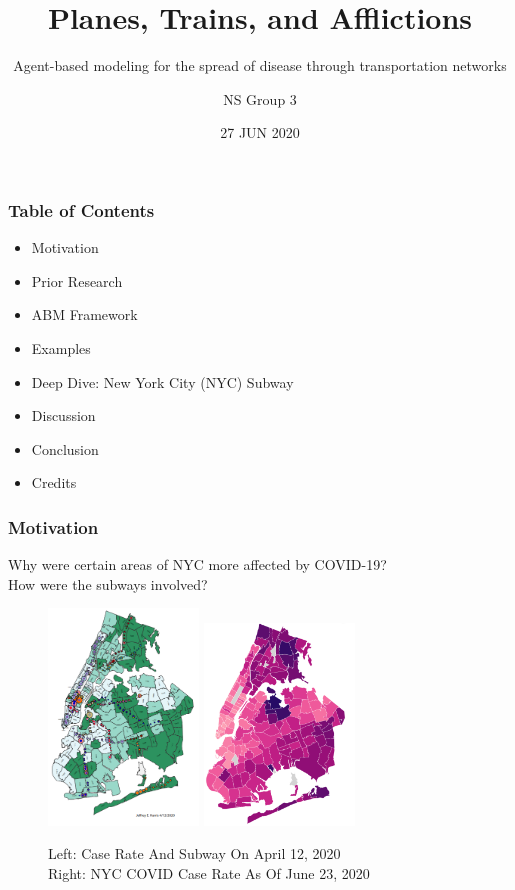 \documentclass{beamer}
\begin{document}
\title{Planes, Trains, and Afflictions}
\subtitle{Agent-based modeling for the spread of disease through transportation networks}
\author{NS Group 3}
\date{27 JUN 2020}
\begin{frame}
\titlepage
\end{frame}
\begin{frame}
\frametitle{Table of Contents}
\begin{itemize}
    \item Motivation
    \item Prior Research
    \item ABM Framework
    \item Examples
    \item Deep Dive: New York City (NYC) Subway
    \item Discussion
    \item Conclusion
    \item Credits
\end{itemize}
\end{frame}
\begin{frame}
\frametitle{Motivation}
Why were certain areas of NYC more affected by COVID-19?\\
How were the subways involved?\\
\begin{figure}
\includegraphics[width=4cm]{Scratch_Visuals/NYC_COVID_Subways_Jeff.png}%
\includegraphics[width=4cm]{Scratch_Visuals/NYC_COVID_Case_Rate.png}
\caption{
Left: Case Rate And Subway On April 12, 2020 \cite{subway_epidemic_seed}\\
Right: NYC COVID Case Rate As Of June 23, 2020 \cite{nyc_health_covid_summary}
}
\end{figure}
\end{frame}
\end{document}
